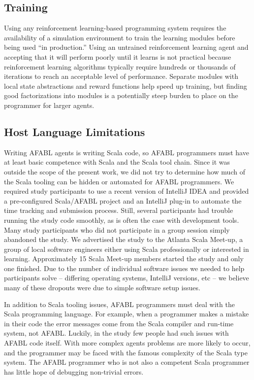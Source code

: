\subsection{Training}

Using any reinforcement learning-based programming system requires the availability of a simulation environment to train the learning modules before being used ``in production.'' Using an untrained reinforcement learning agent and accepting that it will perform poorly until it learns is not practical because reinforcement learning algorithms typically require hundreds or thousands of iterations to reach an acceptable level of performance. Separate modules with local state abstractions and reward functions help speed up training, but finding good factorizations into modules is a potentially steep burden to place on the programmer for larger agents.

\subsection{Host Language Limitations}

Writing AFABL agents is writing Scala code, so AFABL programmers must have at least basic competence with Scala and the Scala tool chain. Since it was outside the scope of the present work, we did not try to determine how much of the Scala tooling can be hidden or automated for AFABL programmers. We required study participants to use a recent version of IntelliJ IDEA and provided a pre-configured Scala/AFABL project and an IntelliJ plug-in to automate the time tracking and submission process. Still, several participants had trouble running the study code smoothly, as is often the case with development tools. Many study participants who did not participate in a group session simply abandoned the study. We advertised the study to the Atlanta Scala Meet-up, a group of local software engineers either using Scala professionally or interested in learning. Approximately 15 Scala Meet-up members started the study and only one finished. Due to the number of individual software issues we needed to help participants solve -- differing operating systems, IntelliJ versions, etc -- we believe many of these dropouts were due to simple software setup issues.

In addition to Scala tooling issues, AFABL programmers must deal with the Scala programming language. For example, when a programmer makes a mistake in their code the error messages come from the Scala compiler and run-time system, not AFABL. Luckily, in the study few people had such issues with AFABL code itself. With more complex agents problems are more likely to occur, and the programmer may be faced with the famous complexity of the Scala type system. The AFABL programmer who is not also a competent Scala programmer has little hope of debugging non-trivial errors.


